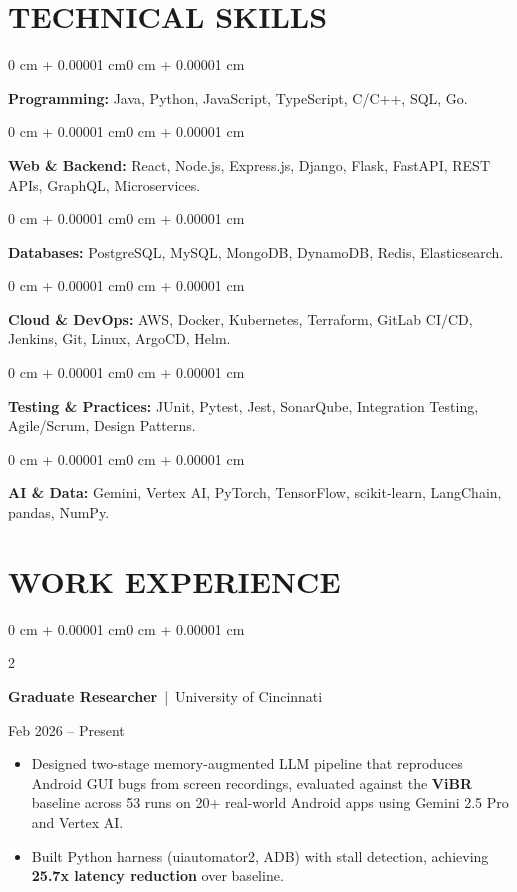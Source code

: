 \documentclass[10pt, letterpaper]{article}
\newenvironment{highlights}{
    \begin{itemize}[
        topsep=0.10 cm,
        parsep=0.06 cm,
        partopsep=0pt,
        itemsep=0.06 cm,
        leftmargin=12pt
    ]
}{
    \end{itemize}
}
\newenvironment{onecolentry}{
    \begin{adjustwidth}{0 cm + 0.00001 cm}{0 cm + 0.00001 cm}
}{
    \end{adjustwidth}
}
\newenvironment{twocolentry}[2][]{
    \onecolentry
    \def\secondColumn{#2}
    \setcolumnwidth{\fill, 4.5 cm}
    \begin{paracol}{2}
}{
    \switchcolumn \raggedleft \secondColumn
    \end{paracol}
    \endonecolentry
}
\begin{document}
\section{TECHNICAL SKILLS}
\begin{onecolentry}
\textbf{Programming:} Java, Python, JavaScript, TypeScript, C/C++, SQL, Go.
\end{onecolentry}
\vspace{0.06 cm}
\begin{onecolentry}
\textbf{Web \& Backend:} React, Node.js, Express.js, Django, Flask, FastAPI, REST APIs, GraphQL, Microservices.
\end{onecolentry}
\vspace{0.06 cm}
\begin{onecolentry}
\textbf{Databases:} PostgreSQL, MySQL, MongoDB, DynamoDB, Redis, Elasticsearch.
\end{onecolentry}
\vspace{0.06 cm}
\begin{onecolentry}
\textbf{Cloud \& DevOps:} AWS, Docker, Kubernetes, Terraform, GitLab CI/CD, Jenkins, Git, Linux, ArgoCD, Helm.
\end{onecolentry}
\vspace{0.06 cm}
\begin{onecolentry}
\textbf{Testing \& Practices:} JUnit, Pytest, Jest, SonarQube, Integration Testing, Agile/Scrum, Design Patterns.
\end{onecolentry}
\vspace{0.06 cm}
\begin{onecolentry}
\textbf{AI \& Data:} Gemini, Vertex AI, PyTorch, TensorFlow, scikit-learn, LangChain, pandas, NumPy.
\end{onecolentry}
\vspace{0.17 cm}

\section{WORK EXPERIENCE}
\begin{twocolentry}{Feb 2026 -- Present}
\textbf{Graduate Researcher} \,|\, University of Cincinnati
\end{twocolentry}
\begin{highlights}
  \item Designed two-stage memory-augmented LLM pipeline that reproduces Android GUI bugs from screen recordings, evaluated against the \textbf{ViBR} baseline across 53 runs on 20+ real-world Android apps using Gemini 2.5 Pro and Vertex AI.
  \item Built Python harness (uiautomator2, ADB) with stall detection, achieving \textbf{25.7x latency reduction} over baseline.
\end{highlights}
\vspace{0.15 cm}
\end{document}

